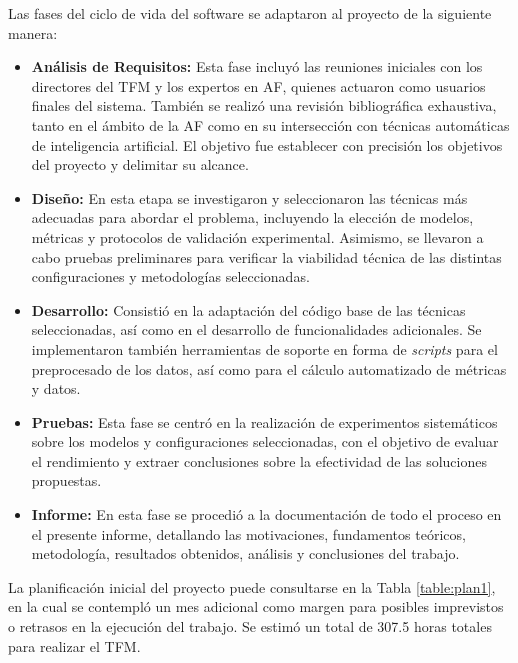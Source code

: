 Las fases del ciclo de vida del software se adaptaron al proyecto de la siguiente manera:

\begin{itemize}
\item \textbf{Análisis de Requisitos:} Esta fase incluyó las reuniones iniciales con los directores del TFM y los expertos en AF, quienes actuaron como usuarios finales del sistema. También se realizó una revisión bibliográfica exhaustiva, tanto en el ámbito de la AF como en su intersección con técnicas automáticas de inteligencia artificial. El objetivo fue establecer con precisión los objetivos del proyecto y delimitar su alcance.

\item \textbf{Diseño:} En esta etapa se investigaron y seleccionaron las técnicas más adecuadas para abordar el problema, incluyendo la elección de modelos, métricas y protocolos de validación experimental. Asimismo, se llevaron a cabo pruebas preliminares para verificar la viabilidad técnica de las distintas configuraciones y metodologías seleccionadas.

\item \textbf{Desarrollo:} Consistió en la adaptación del código base de las técnicas seleccionadas, así como en el desarrollo de funcionalidades adicionales. Se implementaron también herramientas de soporte en forma de \textit{scripts} para el preprocesado de los datos, así como para el cálculo automatizado de métricas y datos.

\item \textbf{Pruebas:} Esta fase se centró en la realización de experimentos sistemáticos sobre los modelos y configuraciones seleccionadas, con el objetivo de evaluar el rendimiento y extraer conclusiones sobre la efectividad de las soluciones propuestas.

\item \textbf{Informe:} En esta fase se procedió a la documentación de todo el proceso en el presente informe, detallando las motivaciones, fundamentos teóricos, metodología, resultados obtenidos, análisis y conclusiones del trabajo.
\end{itemize}

La planificación inicial del proyecto puede consultarse en la Tabla \ref{table:plan1}, en la cual se contempló un mes adicional como margen para posibles imprevistos o retrasos en la ejecución del trabajo. Se estimó un total de 307.5 horas totales para realizar el TFM.

